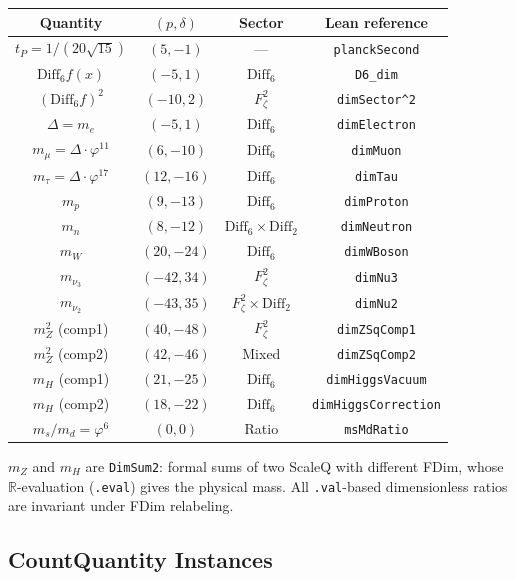 \begin{center}
\begin{tabular}{|c|c|c|c|}
\hline
Quantity & $(p, \delta)$ & Sector & Lean reference \\
\hline
$t_P = 1/(20\sqrt{15})$ & $(5, -1)$ & --- & \texttt{planckSecond} \\
$\mathrm{Diff}_6 f(x)$ & $(-5, 1)$ & $\mathrm{Diff}_6$ & \texttt{D6\_dim} \\
$(\mathrm{Diff}_6 f)^2$ & $(-10, 2)$ & $F_\zeta^2$ & \verb|dimSector^2| \\
$\Delta = m_e$ & $(-5, 1)$ & $\mathrm{Diff}_6$ & \texttt{dimElectron} \\
$m_\mu = \Delta \cdot \varphi^{11}$ & $(6, -10)$ & $\mathrm{Diff}_6$ & \texttt{dimMuon} \\
$m_\tau = \Delta \cdot \varphi^{17}$ & $(12, -16)$ & $\mathrm{Diff}_6$ & \texttt{dimTau} \\
$m_p$ & $(9, -13)$ & $\mathrm{Diff}_6$ & \texttt{dimProton} \\
$m_n$ & $(8, -12)$ & $\mathrm{Diff}_6 \times \mathrm{Diff}_2$ & \texttt{dimNeutron} \\
$m_W$ & $(20, -24)$ & $\mathrm{Diff}_6$ & \texttt{dimWBoson} \\
$m_{\nu_3}$ & $(-42, 34)$ & $F_\zeta^2$ & \texttt{dimNu3} \\
$m_{\nu_2}$ & $(-43, 35)$ & $F_\zeta^2 \times \mathrm{Diff}_2$ & \texttt{dimNu2} \\
\hline
$m_Z^2$ (comp1) & $(40, -48)$ & $F_\zeta^2$ & \texttt{dimZSqComp1} \\
$m_Z^2$ (comp2) & $(42, -46)$ & Mixed & \texttt{dimZSqComp2} \\
$m_H$ (comp1) & $(21, -25)$ & $\mathrm{Diff}_6$ & \texttt{dimHiggsVacuum} \\
$m_H$ (comp2) & $(18, -22)$ & $\mathrm{Diff}_6$ & \texttt{dimHiggsCorrection} \\
\hline
$m_s/m_d = \varphi^6$ & $(0, 0)$ & Ratio & \texttt{msMdRatio} \\
\hline
\end{tabular}
\end{center}

$m_Z$ and $m_H$ are \texttt{DimSum2}: formal sums of two ScaleQ with different FDim,
whose $\mathbb{R}$-evaluation (\texttt{.eval}) gives the physical mass.
All \texttt{.val}-based dimensionless ratios are invariant under FDim relabeling.

\subsection{CountQuantity Instances}

